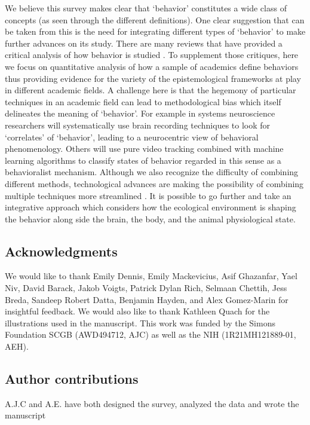 \documentclass[a4paper, 11pt]{article}
\begin{document}
We believe this survey makes clear that `behavior' constitutes a wide class of concepts (as seen through the different definitions). One clear suggestion that can be taken from this is the need for integrating different types of `behavior' to make further advances on its study. There are many reviews that have provided a critical analysis of how behavior is studied \cite{gomez2019life, krakauer2017neuroscience}. To supplement those critiques, here we focus on quantitative analysis of how a sample of academics define behaviors thus providing evidence for the variety of the epistemological frameworks at play in different academic fields. A challenge here is that the hegemony of particular techniques in an academic field can lead to methodological bias which itself delineates the meaning of `behavior'. For example in systems neuroscience researchers will systematically use brain recording techniques to look for `correlates' of `behavior', leading to a neurocentric view of behavioral phenomenology. Others will use pure video tracking combined with machine learning algorithms to classify states of behavior regarded in this sense as a behavioralist mechanism. Although we also recognize the difficulty of combining different methods, technological advances are making the possibility of combining multiple techniques more streamlined \cite{markowitz2018striatum}. It is possible to go further and take an integrative approach which considers how the ecological environment is shaping the behavior along side the brain, the body, and the animal physiological state. 

\subsection*{Acknowledgments}
We would like to thank Emily Dennis, Emily Mackevicius, Asif Ghazanfar, Yael Niv, David Barack, Jakob Voigts, Patrick Dylan Rich, Selmaan Chettih, Jess Breda, Sandeep Robert Datta, Benjamin Hayden, and Alex Gomez-Marin for insightful feedback. We would also like to thank Kathleen Quach for the illustrations used in the manuscript. This work was funded by the Simons Foundation SCGB (AWD494712, AJC) as well as the NIH (1R21MH121889-01, AEH).

\subsection*{Author contributions}
A.J.C and A.E. have both designed the survey, analyzed the data and wrote the manuscript
\end{document}
